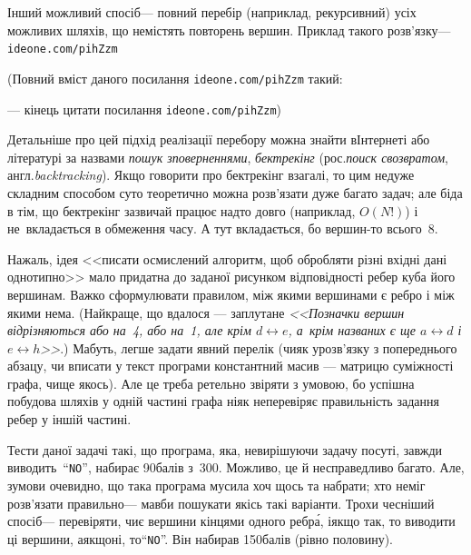 \documentclass[14pt,a4paper]{extarticle}
\renewcommand{\baselinestretch}{1.3125}
\begin{document}
Інший можливий спосіб\nolinebreak[3] --- повний перебір (наприклад, рекурсивний) усіх можливих шляхів, що не\nolinebreak[3] містять повторень вершин. Приклад такого розв'язку\nolinebreak[3] --- 
\verb"ideone.com/pihZzm"


{\color{green}\begin{small}

\renewcommand{\baselinestretch}{0.875}

(Повний вміст даного посилання \verb"ideone.com/pihZzm" такий:

--- кінець цитати посилання \verb"ideone.com/pihZzm")

\end{small}}


\hspace{0.5em plus 1em} Детальніше про цей підхід реалізації перебору можна знайти в\nolinebreak[3] Інтернеті або літературі за назвами \emph{пошук з\nolinebreak[3] поверненнями}, \emph{бектрекінг} (рос.\nolinebreak[3] \emph{поиск с\nolinebreak[3] возвратом}, англ.\nolinebreak[3] \emph{backtracking}). Якщо говорити про бектрекінг взагалі, то цим не\nolinebreak[3] дуже складним способом суто теоретично можна розв'язати дуже багато задач; але біда в тім, що бектрекінг зазвичай працює надто довго (наприклад, $O(N!)$) і не~вкладається в обмеження часу. А тут вкладається, бо вершин-то всього~8.

На\nolinebreak[3] жаль, ідея <<писати осмислений алгоритм, щоб обробляти різні вхідні дані однотипно>> мало придатна до заданої рисунком відповідності ребер куба його вершинам. Важко сформулювати правилом, між якими вершинами є ребро і між якими нема. (Найкраще, що вдалося --- заплутане \textsl{<<Позначки вершин відрізняються або на~4, або на~1, але крім $d{\leftrightarrow}e$, а~крім названих є ще $a{\leftrightarrow}d$ і\nolinebreak[3] $e{\leftrightarrow}h$>>}.) Мабуть, легше задати явний перелік (чи\nolinebreak[3] як у\nolinebreak[3] розв'язку з попереднього абзацу, чи вписати у текст програми константний масив --- матрицю суміжності графа, чи\nolinebreak[2] ще якось). Але це треба ретельно звіряти з умовою, бо успішна побудова шляхів у одній частині графа ніяк не\nolinebreak[3] перевіряє правильність задання ребер у іншій частині. 

\label{text:log-cube-how-to-get-part-of-points-easily}
Тести даної задачі такі, що програма, яка, не\nolinebreak[3] вирішуючи задачу по\nolinebreak[3] суті, завжди виводить~``\texttt{NO}'', набирає 90\nolinebreak[3] балів з~300. Можливо, це й несправедливо багато. Але, з\nolinebreak[3] умови очевидно, що така програма мусила хоч щось та набрати; хто не\nolinebreak[3] міг розв'язати правильно\nolinebreak[3] --- мав\nolinebreak[3] би пошукати якісь такі варіанти.
Трохи чесніший спосіб\nolinebreak[3] --- перевіряти, чи\nolinebreak[3] є вершини кінцями одного ребр\'{а}, і\nolinebreak[3] якщо так, то виводити ці вершини, а\nolinebreak[3] якщо\nolinebreak[3] ні, то\nolinebreak[3] ``\texttt{NO}''. Він набирав 150\nolinebreak[3] балів (рівно половину).
\end{document}
